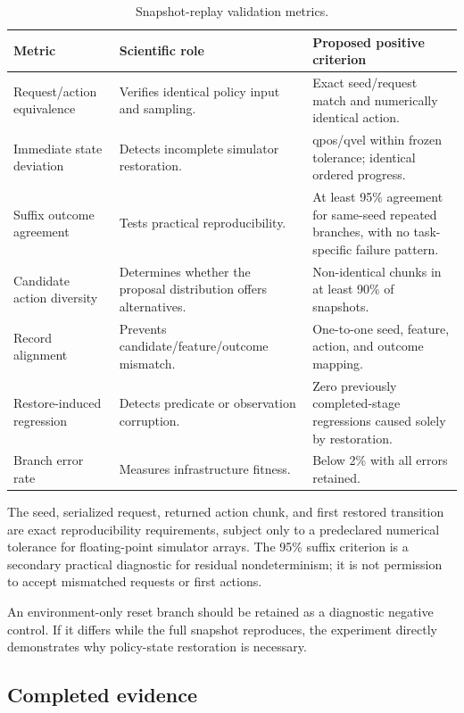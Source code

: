 \begin{table}[H]
\centering
\caption{Snapshot-replay validation metrics.}
\label{tab:phase2-metrics}
\small
\begin{tabularx}{\textwidth}{P{0.28\textwidth}Y P{0.22\textwidth}}
\toprule
Metric & Scientific role & Proposed positive criterion \\
\midrule
Request/action equivalence & Verifies identical policy input and sampling. & Exact seed/request match and numerically identical action. \\
Immediate state deviation & Detects incomplete simulator restoration. & qpos/qvel within frozen tolerance; identical ordered progress. \\
Suffix outcome agreement & Tests practical reproducibility. & At least 95\% agreement for same-seed repeated branches, with no task-specific failure pattern. \\
Candidate action diversity & Determines whether the proposal distribution offers alternatives. & Non-identical chunks in at least 90\% of snapshots. \\
Record alignment & Prevents candidate/feature/outcome mismatch. & One-to-one seed, feature, action, and outcome mapping. \\
Restore-induced regression & Detects predicate or observation corruption. & Zero previously completed-stage regressions caused solely by restoration. \\
Branch error rate & Measures infrastructure fitness. & Below 2\% with all errors retained. \\
\bottomrule
\end{tabularx}
\end{table}

The seed, serialized request, returned action chunk, and first restored transition are exact reproducibility requirements, subject only to a predeclared numerical tolerance for floating-point simulator arrays. The 95\% suffix criterion is a secondary practical diagnostic for residual nondeterminism; it is not permission to accept mismatched requests or first actions.

An environment-only reset branch should be retained as a diagnostic negative control. If it differs while the full snapshot reproduces, the experiment directly demonstrates why policy-state restoration is necessary.

\subsection{Completed evidence}

